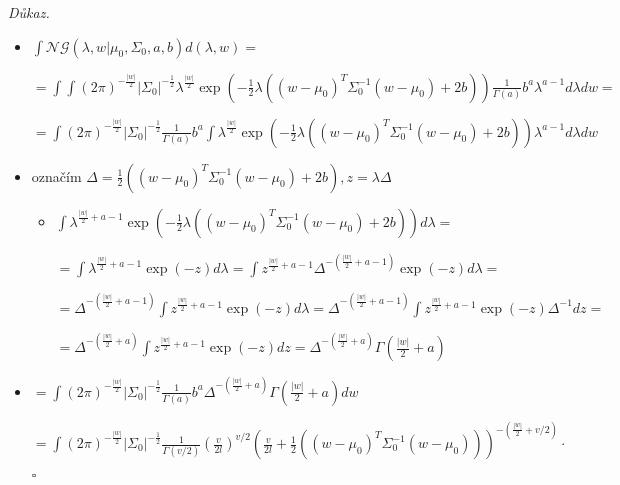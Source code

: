 \documentclass{article}
\newenvironment{pitemize}{
\begin{itemize}
  \setlength{\itemsep}{5pt}
  \setlength{\parskip}{0pt}
  \setlength{\parsep}{0pt}
}{\end{itemize}}
\newenvironment{pproof}{
\noindent\emph{Důkaz.}
\begin{pitemize}
}{\hfill$\square$\end{pitemize}}
\newcommand{\NoG}{\mathcal{NG}}
\theoremstyle{definition}
\begin{document}
\begin{pproof}
\item $\int\NoG\left(\lambda,w|\mu_0,\Sigma_0,a,b\right) d (\lambda,w) = $

$=\int\int (2\pi)^{-\frac{\left|w\right|}{2}} 
\left|\Sigma_0\right|^{-\frac{1}{2}}
\lambda^{\frac{\left|w\right|}{2}} \exp\left(-\frac{1}{2}\lambda\left(\left(w-\mu_0\right)^T \Sigma_0^{-1}\left(w- \mu_0\right)+2b\right)\right)\frac{1}{\Gamma(a)} b^a \lambda^{a-1}d\lambda  dw=$

$= \int(2\pi)^{-\frac{\left|w\right|}{2}}  \left|\Sigma_0\right|^{-\frac{1}{2}}
\frac{1}{\Gamma(a)} b^a
\int
\lambda^{\frac{\left|w\right|}{2}} \exp\left(-\frac{1}{2}\lambda\left(\left(w-\mu_0\right)^T \Sigma_0^{-1}\left(w- \mu_0\right)+2b\right)\right) \lambda^{a-1}d\lambda dw$

\item označím 
$\Delta=\frac{1}{2}\left(\left(w-\mu_0\right)^T \Sigma_0^{-1}\left(w- \mu_0\right)+2b\right), z=\lambda\Delta$
\begin{itemize}
\item $\int
\lambda^{\frac{\left|w\right|}{2}+a-1} \exp\left(-\frac{1}{2}\lambda\left(\left(w-\mu_0\right)^T \Sigma_0^{-1}\left(w- \mu_0\right)+2b\right)\right) d\lambda=$

$=\int
\lambda^{\frac{\left|w\right|}{2}+a-1} \exp\left(-z\right) d\lambda
=\int
z^{\frac{\left|w\right|}{2}+a-1} \Delta^{-\left(\frac{\left|w\right|}{2}+a-1\right)}\exp\left(-z\right) d\lambda
=$

$=
 \Delta^{-\left(\frac{\left|w\right|}{2}+a-1\right)}
\int
z^{\frac{\left|w\right|}{2}+a-1}
\exp\left(-z\right) d\lambda=
 \Delta^{-\left(\frac{\left|w\right|}{2}+a-1\right)}
\int
z^{\frac{\left|w\right|}{2}+a-1}
\exp\left(-z\right)\Delta^{-1} dz=
$

$=
 \Delta^{-\left(\frac{\left|w\right|}{2}+a\right)}
\int
z^{\frac{\left|w\right|}{2}+a-1}
\exp\left(-z\right) dz= \Delta^{-\left(\frac{\left|w\right|}{2}+a\right)}
\Gamma\left(\frac{\left|w\right|}{2}+a\right)
$
\end{itemize}

\item$= \int(2\pi)^{-\frac{\left|w\right|}{2}}  \left|\Sigma_0\right|^{-\frac{1}{2}}
\frac{1}{\Gamma(a)} b^a
\Delta^{-\left(\frac{\left|w\right|}{2}+a\right)}
\Gamma\left(\frac{\left|w\right|}{2}+a\right) dw$

$=\int(2\pi)^{-\frac{\left|w\right|}{2}}  \left|\Sigma_0\right|^{-\frac{1}{2}}
\frac{1}{\Gamma(v/2)} \left(\frac{v}{2l}\right)^{v/2}
\left(\frac{v}{2l}+\frac{1}{2}\left(\left(w-\mu_0\right)^T \Sigma_0^{-1}\left(w- \mu_0\right)\right)\right)^{-\left(\frac{\left|w\right|}{2}+v/2\right)}\cdot$
\nopagebreak


\end{pproof}
\end{document}
